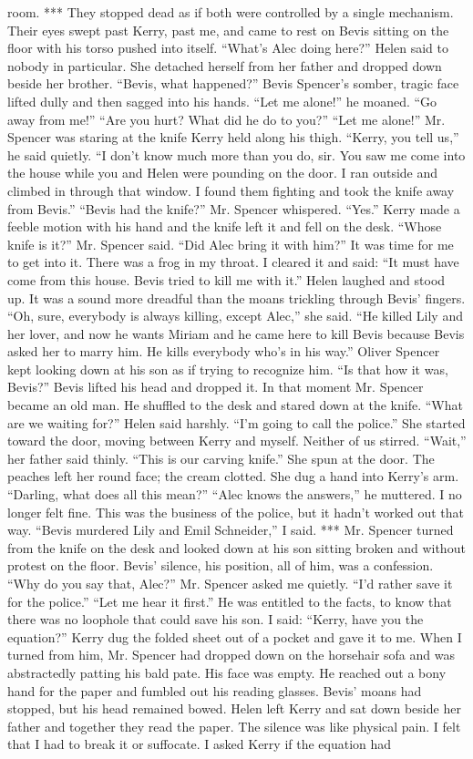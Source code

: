 \documentclass{novel}
\begin{document}
room. *** They stopped dead as if both were controlled by a single mechanism. Their eyes swept past Kerry, past me, and came to rest on Bevis sitting on the floor with his torso pushed into itself. “What’s Alec doing here?” Helen said to nobody in particular. She detached herself from her father and dropped down beside her brother. “Bevis, what happened?” Bevis Spencer’s somber, tragic face lifted dully and then sagged into his hands. “Let me alone!” he moaned. “Go away from me!” “Are you hurt? What did he do to you?” “Let me alone!” Mr. Spencer was staring at the knife Kerry held along his thigh. “Kerry, you tell us,” he said quietly. “I don’t know much more than you do, sir. You saw me come into the house while you and Helen were pounding on the door. I ran outside and climbed in through that window. I found them fighting and took the knife away from Bevis.” “Bevis had the knife?” Mr. Spencer whispered. “Yes.” Kerry made a feeble motion with his hand and the knife left it and fell on the desk. “Whose knife is it?” Mr. Spencer said. “Did Alec bring it with him?” It was time for me to get into it. There was a frog in my throat. I cleared it and said: “It must have come from this house. Bevis tried to kill me with it.” Helen laughed and stood up. It was a sound more dreadful than the moans trickling through Bevis’ fingers. “Oh, sure, everybody is always killing, except Alec,” she said. “He killed Lily and her lover, and now he wants Miriam and he came here to kill Bevis because Bevis asked her to marry him. He kills everybody who’s in his way.” Oliver Spencer kept looking down at his son as if trying to recognize him. “Is that how it was, Bevis?” Bevis lifted his head and dropped it. In that moment Mr. Spencer became an old man. He shuffled to the desk and stared down at the knife. “What are we waiting for?” Helen said harshly. “I’m going to call the police.” She started toward the door, moving between Kerry and myself. Neither of us stirred. “Wait,” her father said thinly. “This is our carving knife.” She spun at the door. The peaches left her round face; the cream clotted. She dug a hand into Kerry’s arm. “Darling, what does all this mean?” “Alec knows the answers,” he muttered. I no longer felt fine. This was the business of the police, but it hadn’t worked out that way. “Bevis murdered Lily and Emil Schneider,” I said. *** Mr. Spencer turned from the knife on the desk and looked down at his son sitting broken and without protest on the floor. Bevis’ silence, his position, all of him, was a confession. “Why do you say that, Alec?” Mr. Spencer asked me quietly. “I’d rather save it for the police.” “Let me hear it first.” He was entitled to the facts, to know that there was no loophole that could save his son. I said: “Kerry, have you the equation?” Kerry dug the folded sheet out of a pocket and gave it to me. When I turned from him, Mr. Spencer had dropped down on the horsehair sofa and was abstractedly patting his bald pate. His face was empty. He reached out a bony hand for the paper and fumbled out his reading glasses. Bevis’ moans had stopped, but his head remained bowed. Helen left Kerry and sat down beside her father and together they read the paper. The silence was like physical pain. I felt that I had to break it or suffocate. I asked Kerry if the equation had 
\end{document}
